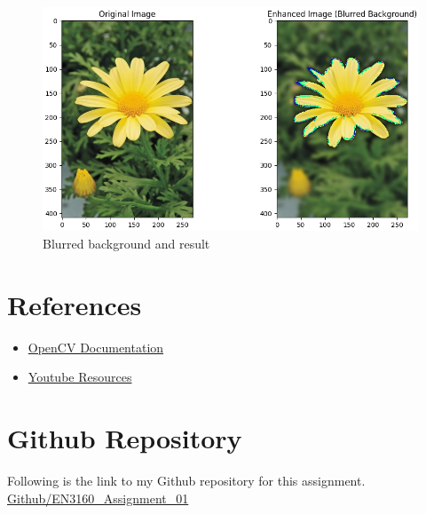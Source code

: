 \documentclass[11pt,a4paper]{article}
\begin{document}
{\begin{figure}[h]
    \centering
    \includegraphics[width=1\linewidth]{images/9-2.png}
    \caption{Blurred background and result}
\end{figure}}


\section{References}

\begin{itemize}
    \item \href{https://opencv.org/}{OpenCV Documentation}
    \item \href{https://www.youtube.com/@RangaRodrigo}{Youtube Resources}
   
\end{itemize}

\section{Github Repository}

Following is the link to my Github repository for this assignment.\\

\href{https://github.com/Vgr20/EN3160Assignment01.git }{Github/EN3160\_Assignment\_01}
\end{document}
